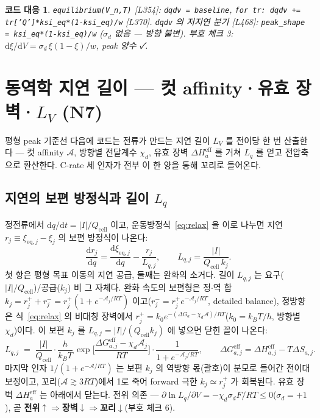 \documentclass[11pt,a4paper]{article}
\newtheorem*{codebox}{코드 대응}
\newcommand{\dd}{\mathrm{d}}
\newcommand{\eff}{\mathrm{eff}}
\newcommand{\eq}{\mathrm{eq}}
\newcommand{\cell}{\mathrm{cell}}
\newcommand{\sgn}{\sigma_d}
\begin{document}
\begin{codebox}
\texttt{equilibrium(V\_n,T)} [L354]: \texttt{dqdv = baseline}, \texttt{for tr: dqdv += tr['Q']*ksi\_eq*(1-ksi\_eq)/w} [L370]. \texttt{dqdv} 의 저지연 분기 [L468]: \texttt{peak\_shape = ksi\_eq*(1-ksi\_eq)/w} ($\sgn$ 없음 — 방향 불변). 부호 체크 3: $\dd\xi/\dd V=\sgn\,\xi(1-\xi)/w$, peak 양수 ✓.
\end{codebox}

\section{동역학 지연 길이 — 컷 affinity·유효 장벽·$L_V$ (N7)}\label{sec:lag}
평형 peak 기준선 다음에 코드는 전류가 만드는 지연 길이 $L_V$ 를 전이당 한 번 산출한다 — 컷 affinity $\mathcal A$, 방향별 전달계수 $\chi_d$, 유효 장벽 $\Delta H_a^\eff$ 를 거쳐 $L_q$ 를 얻고 전압축으로 환산한다. C-rate 세 인자가 전부 이 한 양을 통해 꼬리로 들어온다.

\subsection{지연의 보편 방정식과 길이 $L_q$}
정전류에서 $\dd q/\dd t=|I|/Q_\cell$ 이고, 운동방정식~\eqref{eq:relax} 을 이로 나누면 지연 $r_j\equiv\xi_{\eq,j}-\xi_j$ 의 보편 방정식이 나온다:
\begin{equation}
\frac{\dd r_j}{\dd q}=\frac{\dd\xi_{\eq,j}}{\dd q}-\frac{r_j}{L_{q,j}},\qquad
L_{q,j}=\frac{|I|}{Q_\cell\,k_j}.
\label{eq:Lq}
\end{equation}
첫 항은 평형 목표 이동의 지연 공급, 둘째는 완화의 소거다. 길이 $L_{q,j}$ 는 요구($|I|/Q_\cell$)/공급($k_j$) 비 그 자체다. 완화 속도의 보편형은 정$\cdot$역 합 $k_j=r_j^++r_j^-=r_j^+(1+e^{-\mathcal A_j/RT})$ 이고($r_j^-=r_j^+e^{-\mathcal A_j/RT}$, detailed balance), 정방향은 식~\eqref{eq:relax} 의 비대칭 장벽에서 $r_j^+=k_0e^{-(\Delta G_a-\chi_d\mathcal A)/RT}$($k_0=k_BT/h$, 방향별 $\chi_d$)이다. 이 보편 $k_j$ 를 $L_{q,j}=|I|/(Q_\cell k_j)$ 에 넣으면 닫힌 꼴이 나온다:
\begin{equation}
L_{q,j}\;=\;\frac{|I|}{Q_\cell}\cdot\frac{h}{k_BT}\,
\exp\!\Big[\frac{\Delta G_{a,j}^\eff-\chi_d\mathcal A_j}{RT}\Big]\cdot\frac{1}{1+e^{-\mathcal A_j/RT}},
\qquad \Delta G_{a,j}^\eff=\Delta H_{a,j}^\eff-T\Delta S_{a,j}.
\label{eq:Lqclosed}
\end{equation}
마지막 인자 $1/(1+e^{-\mathcal A/RT})$ 는 보편 $k_j$ 의 역방향 몫(괄호)이 분모로 들어간 전이대 보정이고, 꼬리($\mathcal A\gtrsim3RT$)에서 1로 죽어 forward 극한 $k_j\simeq r_j^+$ 가 회복된다. 유효 장벽 $\Delta H_a^\eff$ 는 아래에서 닫는다. 전위 의존 — $\partial\ln L_q/\partial V=-\chi_d\sgn F/RT\le0$($\sgn=+1$), 곧 \textbf{전위$\uparrow\Rightarrow$장벽$\downarrow\Rightarrow$꼬리$\downarrow$}(부호 체크 6).
\end{document}
